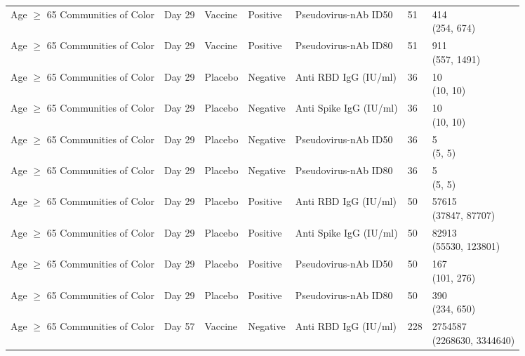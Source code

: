 \documentclass[]{book}
\theoremstyle{definition}
\theoremstyle{definition}
\theoremstyle{definition}
\newcommand{\1}{\mathbbm{1}}
\begin{document}
\begin{landscape}
\begin{ThreePartTable}
\begin{longtable}[t]{>{\raggedright\arraybackslash}p{7cm}llllll}
\hspace{1em}Age $\geq$ 65 Communities of Color & Day 29 & Vaccine & Positive & Pseudovirus-nAb ID50 & 51 & \makecell[l]{414\\(254, 674)}\\
\hspace{1em}Age $\geq$ 65 Communities of Color & Day 29 & Vaccine & Positive & Pseudovirus-nAb ID80 & 51 & \makecell[l]{911\\(557, 1491)}\\
\hspace{1em}Age $\geq$ 65 Communities of Color & Day 29 & Placebo & Negative & Anti RBD IgG (IU/ml) & 36 & \makecell[l]{10\\(10, 10)}\\
\hspace{1em}Age $\geq$ 65 Communities of Color & Day 29 & Placebo & Negative & Anti Spike IgG (IU/ml) & 36 & \makecell[l]{10\\(10, 10)}\\
\hspace{1em}Age $\geq$ 65 Communities of Color & Day 29 & Placebo & Negative & Pseudovirus-nAb ID50 & 36 & \makecell[l]{5\\(5, 5)}\\
\hspace{1em}Age $\geq$ 65 Communities of Color & Day 29 & Placebo & Negative & Pseudovirus-nAb ID80 & 36 & \makecell[l]{5\\(5, 5)}\\
\hspace{1em}Age $\geq$ 65 Communities of Color & Day 29 & Placebo & Positive & Anti RBD IgG (IU/ml) & 50 & \makecell[l]{57615\\(37847, 87707)}\\
\hspace{1em}Age $\geq$ 65 Communities of Color & Day 29 & Placebo & Positive & Anti Spike IgG (IU/ml) & 50 & \makecell[l]{82913\\(55530, 123801)}\\
\hspace{1em}Age $\geq$ 65 Communities of Color & Day 29 & Placebo & Positive & Pseudovirus-nAb ID50 & 50 & \makecell[l]{167\\(101, 276)}\\
\hspace{1em}Age $\geq$ 65 Communities of Color & Day 29 & Placebo & Positive & Pseudovirus-nAb ID80 & 50 & \makecell[l]{390\\(234, 650)}\\
\hspace{1em}Age $\geq$ 65 Communities of Color & Day 57 & Vaccine & Negative & Anti RBD IgG (IU/ml) & 228 & \makecell[l]{2754587\\(2268630, 3344640)}\\

\end{longtable}
\end{ThreePartTable}
\end{landscape}
\end{document}
